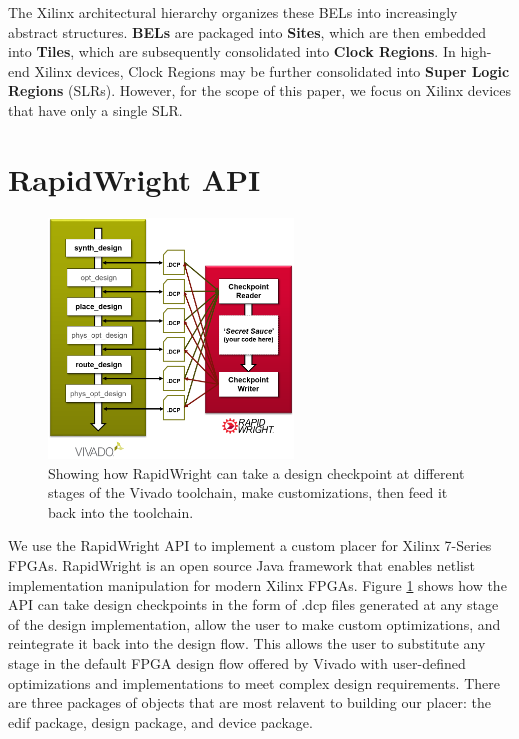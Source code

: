 \documentclass[twocolumn]{article}
\begin{document}
    The Xilinx architectural hierarchy organizes these BELs into increasingly abstract structures. 
    \textbf{BELs} are packaged into \textbf{Sites}, which are then embedded into \textbf{Tiles}, which are subsequently consolidated into \textbf{Clock Regions}. 
    In high-end Xilinx devices, Clock Regions may be further consolidated into \textbf{Super Logic Regions} (SLRs). 
    However, for the scope of this paper, we focus on Xilinx devices that have only a single SLR. 


\section{RapidWright API}
    \begin{figure}
        \centering
        \includegraphics[width=6.5cm]{figures/vivado_dcps.png}
        \caption{Showing how RapidWright can take a design checkpoint at different stages of the Vivado toolchain, make customizations, then feed it back into the toolchain.}
        \label{fig:vivado_dcps}
    \end{figure}

    We use the RapidWright API to implement a custom placer for Xilinx 7-Series FPGAs.
    RapidWright is an open source Java framework that enables netlist implementation manipulation for modern Xilinx FPGAs. 
    Figure \ref{fig:vivado_dcps} shows how the API can take design checkpoints in the form of .dcp files generated at any stage of the design implementation, allow the user to make custom optimizations, and reintegrate it back into the design flow. 
    This allows the user to substitute any stage in the default FPGA design flow offered by Vivado with user-defined optimizations and implementations to meet complex design requirements. 
    There are three packages of objects that are most relavent to building our placer: the edif package, design package, and device package. 
\end{document}
